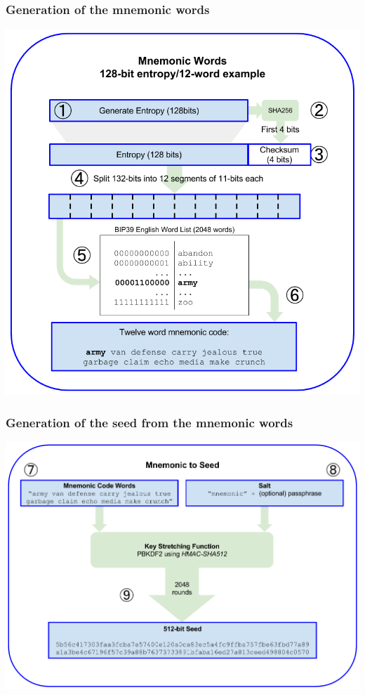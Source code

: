 \documentclass[11pt]{beamer}  %
\begin{document}
\begin{frame}\frametitle{Generation of the mnemonic words}

  \begin{center}
    \includegraphics[scale=0.27,clip=false]{pictures/entropy-to-mnemonic.png}
  \end{center}

\end{frame}

\begin{frame}\frametitle{Generation of the seed from the mnemonic words}

  \begin{center}
    \includegraphics[scale=0.27,clip=false]{pictures/mnemonic-to-seed.png}
  \end{center}

\end{frame}
\end{document}
